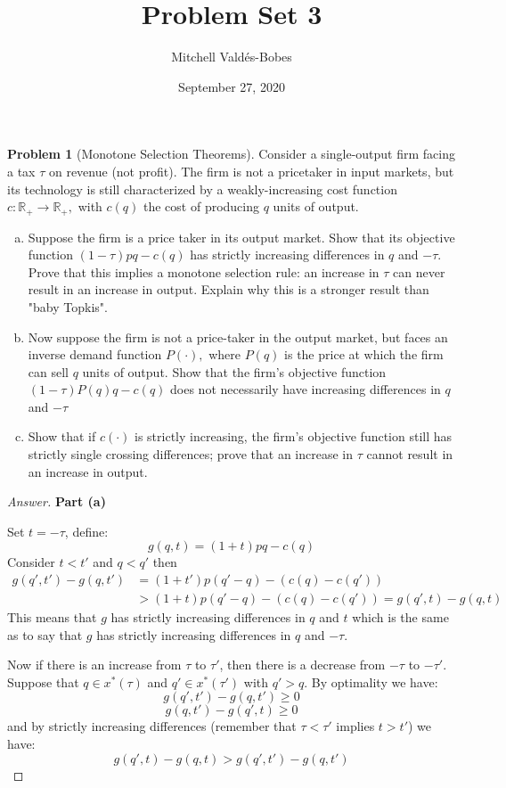 \documentclass{article}
\title{Problem Set 3}
\author{Mitchell Valdés-Bobes}
\date{September 27, 2020}
\theoremstyle{definition}
\newtheorem{problem}{Problem}
\begin{document}
\maketitle
\begin{problem}[Monotone Selection Theorems]
Consider a single-output firm facing a tax $\tau$ on revenue (not profit). The firm is not a pricetaker in input markets, but its technology is still characterized by a weakly-increasing cost function $c: \mathbb{R}_{+} \rightarrow \mathbb{R}_{+},$ with $c(q)$ the cost of producing $q$ units of output.
\begin{enumerate}[(a)]
    \item Suppose the firm is a price taker in its output market. Show that its objective function $(1-\tau) p q-c(q)$ has strictly increasing differences in $q$ and $-\tau .$ Prove that this implies a monotone selection rule: an increase in $\tau$ can never result in an increase in output. Explain why this is a stronger result than "baby Topkis".
    \item Now suppose the firm is not a price-taker in the output market, but faces an inverse demand function $P(\cdot),$ where $P(q)$ is the price at which the firm can sell $q$ units of output.
    Show that the firm's objective function $(1-\tau) P(q) q-c(q)$ does not necessarily have increasing differences in $q$ and $-\tau$
    \item Show that if $c(\cdot)$ is strictly increasing, the firm's objective function still has strictly single crossing differences; prove that an increase in $\tau$ cannot result in an increase in output.
\end{enumerate}

\begin{proof}[Answer]

\textbf{Part (a)}

Set $t=-\tau$, define:
$$g(q,t) = (1+t)pq-c(q)$$
Consider $t<t'$ and $q<q'$ then
 \begin{align*}
     g(q',t')-g(q,t') &= (1+t')p(q'-q) - (c(q)-c(q'))\\
                      &> (1+t)p(q'-q) - (c(q)-c(q')) = g(q',t)-g(q,t)
 \end{align*}
This means that $g$ has strictly increasing differences in $q$ and $t$ which is the same as to say that $g$ has strictly increasing differences in $q$ and $-\tau$.

Now if there is an increase from $\tau$  to $\tau'$, then there is a decrease from $-\tau$  to $-\tau'$. Suppose that $q\in x^*(\tau)$ and $q'\in x^*(\tau')$ with $q'>q$. By optimality we have:
$$g(q',t')-g(q,t')\geq 0$$
$$g(q,t')-g(q',t)\geq 0$$
and by strictly increasing differences (remember that $\tau<\tau'$ implies $t>t'$) we have:
$$g(q',t)-g(q,t)>g(q',t')-g(q,t')$$


\end{proof}
\end{problem}
\end{document}
